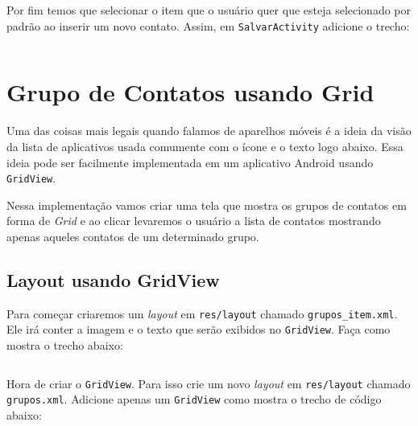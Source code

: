 \begin{listing}[H]
  \inputminted[linenos=true,frame=bottomline,tabsize=3]{ java }{ source/MainActivity-13.java }
  \caption{Mudança em método irParaSalvar [MainActivity.java]}
\end{listing}

Por fim temos que selecionar o item que o usuário quer que esteja
selecionado por padrão ao inserir um novo contato. Assim, em
\texttt{SalvarActivity} adicione o trecho:

\begin{listing}[H]
  \inputminted[linenos=true,frame=bottomline,tabsize=3]{ java }{ source/SalvarActivity-7.java }
  \caption{Obtem o valor padrão definido nas Preferências [SalvarActivity.java]}
\end{listing}

\section{Grupo de Contatos usando Grid}

Uma das coisas mais legais quando falamos de aparelhos móveis é a ideia
da visão da lista de aplicativos usada comumente com o ícone e o texto
logo abaixo. Essa ideia pode ser facilmente implementada em um
aplicativo Android usando \texttt{GridView}.

Nessa implementação vamos criar uma tela que mostra os grupos de
contatos em forma de \emph{Grid} e ao clicar levaremos o usuário a lista
de contatos mostrando apenas aqueles contatos de um determinado grupo.

\subsection{Layout usando GridView}

Para começar criaremos um \emph{layout} em \texttt{res/layout} chamado
\texttt{grupos\_item.xml}. Ele irá conter a imagem e o texto que serão
exibidos no \texttt{GridView}. Faça como mostra o trecho abaixo:

\begin{listing}[H]
  \inputminted[linenos=true,frame=bottomline,tabsize=3]{ xml }{ source/grupos_item-1.xml }
  \caption{Item do Layout de Grupos [res/layout/grupos\b{ }item.xml]}
\end{listing}

Hora de criar o \texttt{GridView}. Para isso crie um novo \emph{layout}
em \texttt{res/layout} chamado \texttt{grupos.xml}. Adicione apenas um
\texttt{GridView} como mostra o trecho de código abaixo:

